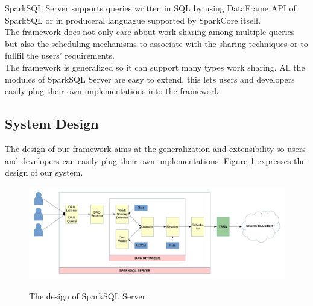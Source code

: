 SparkSQL Server supports queries written in SQL by using DataFrame API of SparkSQL or in produceral languague supported by SparkCore itself.\\

The framework does not only care about work sharing among multiple queries but also the scheduling mechanisms to associate with the sharing techniques or to fullfil the users' requirements.\\

The framework is generalized so it can support many types work sharing. All the modules of SparkSQL Server are easy to extend, this lets users and developers easily plug their own implementations into the framework.\\

\subsection{System Design}
The design of our framework aims at the generalization and extensibility so users and developers can easily plug their own implementations. Figure \ref{fig:sparksql-design} expresses the design of our system.\\
\begin{figure}
\includegraphics[width=\textwidth]{Figures/sparksql-server-design.jpg}
\label{fig:sparksql-design}
\caption{The design of SparkSQL Server}
\end{figure}


